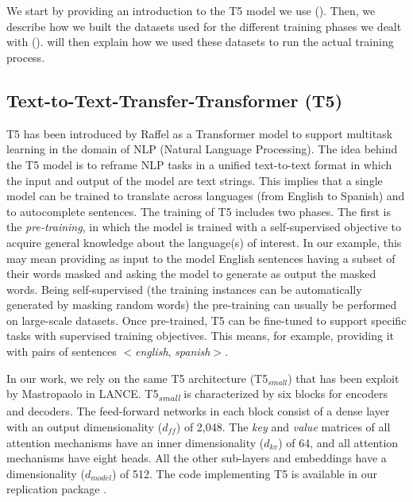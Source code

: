 \section{\approach} \label{sec:t5}

We start by providing an introduction to the T5 model we use (). Then, we describe how we built the datasets used for the different training phases we dealt with ().   will then explain how we used these datasets to run the actual training process.


\subsection{Text-to-Text-Transfer-Transformer (T5)}
\label{sub:t5}
T5 has been introduced by Raffel \etal \cite{raffel2019exploring} as a Transformer \cite{vaswani2017attention} model to support multitask learning in the domain of NLP (Natural Language Processing). The idea behind the T5 model is to reframe NLP tasks in a unified text-to-text format in which the input and output of the model are text strings. This implies that a single model can be trained to translate across languages (\eg from English to Spanish) and to autocomplete sentences. The training of T5 includes two phases. The first is the \textit{pre-training}, in which the model is trained with a self-supervised objective to acquire general knowledge about the language(s) of interest. In our example, this may mean providing as input to the model English sentences having a subset of their words masked and asking the model to generate as output the masked words. Being self-supervised (\ie the training instances can be automatically generated by masking random words) the pre-training can usually be performed on large-scale datasets. Once pre-trained, T5 can be fine-tuned to support specific tasks with supervised training objectives. This means, for example, providing it with pairs of sentences $<$\emph{english}, \emph{spanish}$>$.

In our work, we rely on the same T5 architecture (\ie T5$_{small}$) that has been exploit by Mastropaolo \etal \cite{mastropaolo2022using} in LANCE. T5\textsubscript{\textit{small}} is characterized by six blocks for encoders and decoders. The feed-forward networks in each block consist of a dense layer with an output dimensionality ($d_{ff}$) of 2,048. The \textit{key} and \textit{value} matrices of all attention mechanisms have an inner dimensionality ($d_{kv}$) of 64, and all attention mechanisms have eight heads. All the other sub-layers and embeddings have a dimensionality ($d_{model}$) of 512. The code implementing T5 is available in our replication package \cite{replication}.


